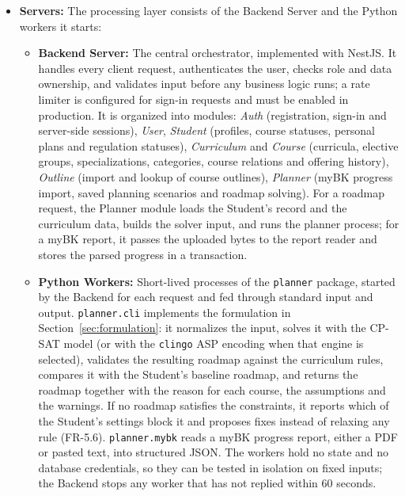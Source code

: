 \begin{itemize}
    \item \textbf{Servers:} The processing layer consists of the Backend Server and the Python workers it starts:
    \begin{itemize}
        \item \textbf{Backend Server:} The central orchestrator, implemented with NestJS. It handles every client request, authenticates the user, checks role and data ownership, and validates input before any business logic runs; a rate limiter is configured for sign-in requests and must be enabled in production. It is organized into modules: \emph{Auth} (registration, sign-in and server-side sessions), \emph{User}, \emph{Student} (profiles, course statuses, personal plans and regulation statuses), \emph{Curriculum} and \emph{Course} (curricula, elective groups, specializations, categories, course relations and offering history), \emph{Outline} (import and lookup of course outlines), \emph{Planner} (myBK progress import, saved planning scenarios and roadmap solving). For a roadmap request, the Planner module loads the Student's record and the curriculum data, builds the solver input, and runs the planner process; for a myBK report, it passes the uploaded bytes to the report reader and stores the parsed progress in a transaction.
        \item \textbf{Python Workers:} Short-lived processes of the \texttt{planner} package, started by the Backend for each request and fed through standard input and output. \texttt{planner.cli} implements the formulation in Section~\ref{sec:formulation}: it normalizes the input, solves it with the CP-SAT model (or with the \texttt{clingo} ASP encoding when that engine is selected), validates the resulting roadmap against the curriculum rules, compares it with the Student's baseline roadmap, and returns the roadmap together with the reason for each course, the assumptions and the warnings. If no roadmap satisfies the constraints, it reports which of the Student's settings block it and proposes fixes instead of relaxing any rule (FR-5.6). \texttt{planner.mybk} reads a myBK progress report, either a PDF or pasted text, into structured JSON. The workers hold no state and no database credentials, so they can be tested in isolation on fixed inputs; the Backend stops any worker that has not replied within 60 seconds.
    \end{itemize}


\end{itemize}
